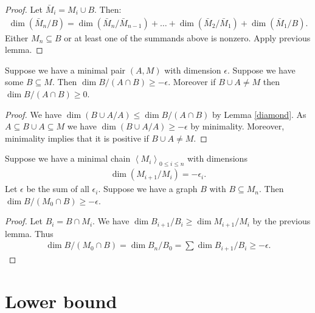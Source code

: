 \documentclass{amsart}
\newcommand{\agl}[1]{\left\langle #1 \right\rangle}
\begin{document}
\begin{proof}
  Let $\bar M_i = M_i \cup B$. Then:
  \begin{align*}
    \dim(\bar M_n/B) = \dim(\bar M_n/\bar M_{n-1}) + \ldots + \dim(\bar M_2/\bar M_1) + \dim(\bar M_1/B).
  \end{align*}
  Either $M_n \subseteq B$ or at least one of the summands above is nonzero.
  Apply previous lemma.
\end{proof}

\begin{Lemma} \label{minimal_subset}
  Suppose we have a minimal pair $(A, M)$ with dimension $\epsilon$.
  Suppose we have some $B \subseteq M$.
  Then $\dim B / (A \cap B) \geq -\epsilon$.
  Moreover if $B \cup A \neq M$ then $\dim B / (A \cap B) \geq 0$.
\end{Lemma}

\begin{proof}
  We have $\dim (B \cup A / A) \leq \dim B / (A \cap B)$ by Lemma \ref{diamond}.
  As $A \subseteq B \cup A \subseteq M$ we have $\dim (B \cup A / A) \geq -\epsilon$ by minimality.
  Moreover, minimality implies that it is positive if $B \cup A \neq M$.
\end{proof}

\begin{Lemma} \label{chain_intersect}
  Suppose we have a minimal chain  $\agl{M_i}_{0 \leq i \leq n}$ with dimensions
  \begin{align*}
    \dim(M_{i+1}/M_i) = -\epsilon_i.
  \end{align*}
  Let $\epsilon$ be the sum of all $\epsilon_i$.
  Suppose we have a graph $B$ with $B \subseteq M_n$.
  Then $\dim B / (M_0 \cap B) \geq -\epsilon$.
\end{Lemma}

\begin{proof}
  Let $B_i = B \cap M_i$.
  We have $\dim B_{i+1}/B_i \geq \dim M_{i+1}/M_i$ by the previous lemma.
  Thus
  \begin{align*}
    \dim B / (M_0 \cap B) = \dim B_n / B_0 = \sum \dim B_{i+1}/B_i \geq -\epsilon.
  \end{align*}
\end{proof}

\section{Lower bound}
\end{document}
